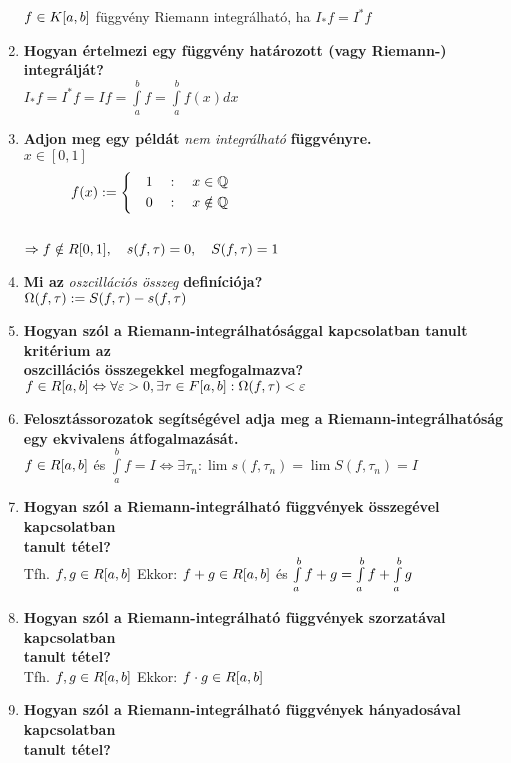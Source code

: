 \documentclass[a4paper,11pt]{article}
\begin{document}
\begin{enumerate}
	$f\in K[a,b]$ függvény Riemann integrálható, ha $I_*f=I^*f$
	\item\textbf{Hogyan értelmezi egy függvény határozott (vagy
	Riemann-) integrálját?}\\[0.1cm]
	$I_*f=I^*f=If=\int\limits_{a}^{b}f=\int\limits_{a}^{b}f(x)dx$
	\item\textbf{Adjon meg egy példát} \textit{nem integrálható}
	\textbf{függvényre.}\\[0.1cm]
	$x\in[0,1]$
	\[\displaystyle f(x) := 
	\left\{
	\begin{gathered}
	\quad 1\quad:\quad x\in\Q\hspace{5.7cm} \\
	\quad 0\quad:\quad x\notin\Q\hspace{5.7cm}
	\end{gathered}\right. \]\\[0.2cm]
	$\Rightarrow f\notin R[0,1],\quad s(f,\tau)=0,\quad S(f,\tau)=1$
	\item\textbf{Mi az} \textit{oszcillációs összeg} \textbf{definíciója?}
	\\[0.1cm]$\Omega(f,\tau):=S(f,\tau)-s(f,\tau)$
	\item\textbf{Hogyan szól a Riemann-integrálhatósággal kapcsolatban
	tanult kritérium az \\ oszcillációs összegekkel megfogalmazva?}\\[0.1cm]
	$f\in R[a,b]\Leftrightarrow\forall\varepsilon>0,\exists\tau\in F[a,b]:\Omega(f,\tau)<
	\varepsilon$
	\item\textbf{Felosztássorozatok segítségével adja meg a Riemann-integrálhatóság
	egy ekvivalens átfogalmazását.}\\[0.1cm]
	$f\in R[a,b]$ és $\int\limits_{a}^{b}f=I\Leftrightarrow
	\exists\tau_n:\lim s(f,\tau_n)=\lim S(f,\tau_n)=I$
	\item\textbf{Hogyan szól a Riemann-integrálható függvények összegével kapcsolatban
	\\ tanult tétel?}\\[0.1cm]
	Tfh. $f,g\in R[a,b]$ Ekkor: $f+g\in R[a,b]$ és $\int\limits_{a}^{b} f+g=\int\limits_{a}^{b} f+\int\limits_{a}^{b} g$
	\item\textbf{Hogyan szól a Riemann-integrálható függvények szorzatával kapcsolatban
	\\ tanult tétel?}\\[0.1cm]
	Tfh. $f,g\in R[a,b]$ Ekkor: $f\cdot g\in R[a,b]$
	\item\textbf{Hogyan szól a Riemann-integrálható függvények hányadosával kapcsolatban
	\\ tanult tétel?}\\[0.1cm]

\end{enumerate}
\end{document}
